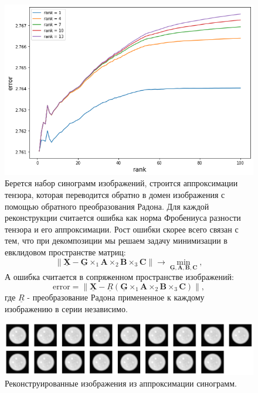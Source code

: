 \documentclass[14pt]{extarticle}
\begin{document}
\begin{figure}[H]
        \centering
        \includegraphics[width=1\textwidth]{exp_2.png}
        
        \caption{Берется набор синограмм изображений, строится аппроксимации тензора, которая переводится обратно в домен изображения с помощью обратного преобразования Радона. Для каждой реконструкции считается ошибка как норма Фробениуса разности тензора и его аппроксимации. Рост ошибки скорее всего связан с тем, что при декомпозиции мы решаем задачу минимизации в евклидовом пространстве матриц:$$\| \mathbf{\underline{X}} - \mathbf{\underline{G}} \times_1 \mathbf{A} \times_2 \mathbf{B} \times_3 \mathbf{C} \| \to \min_{\mathbf{\underline{G}}, \mathbf{A}, \mathbf{B}, \mathbf{C}},$$ А ошибка считается в сопряженном пространстве изображений:
        $$\mathrm{error} = \| \mathbf{\underline{X}} - \underline{R}\left (\mathbf{\underline{G}} \times_1 \mathbf{A} \times_2 \mathbf{B} \times_3 \mathbf{C}\right) \|,$$ где $\underline{R}$ - преобразование Радона примененное к каждому изображению в серии независимо.}
        \label{fig_3}
\end{figure}

\begin{figure}[H]
        \centering
        \includegraphics[width=1\textwidth]{exp_3.png}
        
        \caption{Реконструированные изображения из аппроксимации синограмм.}
        \label{fig_5}
\end{figure}
\end{document}
